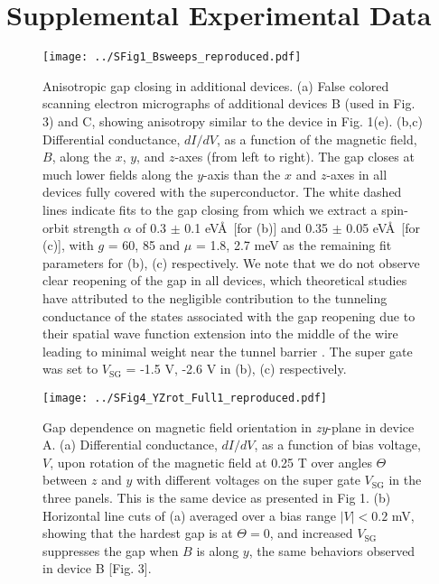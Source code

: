 \documentclass[prl,singlecolumn,notitlepage,secnumroman,superscriptaddress,nobibnotes,graphicx,amsmath,amssymb]{revtex4-2}
\begin{document}
\section{Supplemental Experimental Data}
\begin{figure}[h!]
\centering
\texttt{[image: ../SFig1\_Bsweeps\_reproduced.pdf]}
\caption{\label{fig:BsweepsReproduced}
	Anisotropic gap closing in additional devices. 
	(a) False colored scanning electron micrographs of additional devices B (used in Fig. 3) and C, showing anisotropy similar to the device in Fig. 1(e). (b,c) Differential conductance, $dI/dV$, as a function of the magnetic field, $B$, along the $x$, $y$, and $z$-axes (from left to right). The gap closes at much lower fields along the $y$-axis than the $x$ and $z$-axes in all devices fully covered with the superconductor. The white dashed lines indicate fits to the gap closing from which we extract a spin-orbit strength $\alpha$ of 0.3 $\pm$ 0.1 eV\AA\ [for (b)] and 0.35 $\pm$ 0.05 eV\AA\ [for (c)], with $g$ = 60, 85 and $\mu$ = 1.8, 2.7 meV as the remaining fit parameters for (b), (c) respectively. We note that we do not observe clear reopening of the gap in all devices, which theoretical studies have attributed to the negligible contribution to the tunneling conductance of the states associated with the gap reopening due to their spatial wave function extension into the middle of the wire leading to minimal weight near the tunnel barrier \cite{Prada2012,Pientka2012,Stanescu2012,Liu2019}. The super gate was set to $V_{\mathrm{SG}}$ = -1.5 V, -2.6 V in (b), (c) respectively.
}
\end{figure}

\begin{figure}[p!]
\centering
\texttt{[image: ../SFig4\_YZrot\_Full1\_reproduced.pdf]}
\caption{\label{fig:YZrotRep}
	Gap dependence on magnetic field orientation in \textit{zy}-plane in device A. 
	(a) Differential conductance, $dI/dV$, as a function of bias voltage, $V$, upon rotation of the magnetic field at 0.25 T over angles $\Theta$ between $z$ and $y$ with different voltages on the super gate $V_{\mathrm{SG}}$ in the three panels. This is the same device as presented in Fig 1. (b) Horizontal line cuts of (a) averaged over a bias range $|V| < 0.2$ mV, showing that the hardest gap is at $\Theta = 0$, and increased $V_{\mathrm{SG}}$ suppresses the gap when $B$ is along $y$, the same behaviors observed in device B [Fig. 3].
}
\end{figure}
\end{document}
